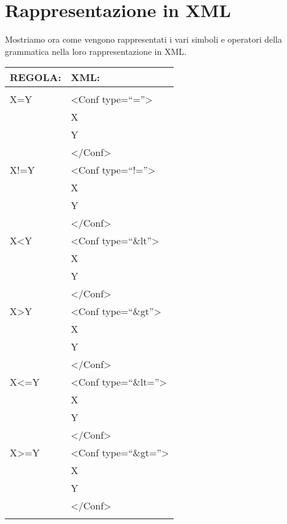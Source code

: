 \section{Rappresentazione in XML}
Mostriamo ora come vengono rappresentati i vari simboli e operatori della grammatica nella loro rappresentazione in XML.
\begin{table}[htbp]
\begin{tabular}{||p{3cm}||p{6.5cm}||}
\hline
\textbf{REGOLA:} & \textbf{XML:} \\ \hline
& \\ \hline
X=Y & \textless Conf type=``=''\textgreater \\
&   X \\
&   Y \\ 
& \textless /Conf\textgreater \\ \hline
X!=Y & \textless Conf type=``!=''\textgreater \\
&  X \\
&  Y \\ 
& \textless /Conf\textgreater\\ \hline
X\textless Y & \textless Conf type=``\&lt''\textgreater \\
&  X \\
&  Y \\ 
& \textless /Conf\textgreater\\ \hline
X\textgreater Y & \textless Conf type=``\&gt''\textgreater \\
&  X \\
&  Y \\ 
& \textless /Conf\textgreater\\ \hline
X\textless=Y & \textless Conf type=``\&lt=''\textgreater \\
&  X \\
&  Y \\ 
& \textless /Conf\textgreater\\ \hline
X\textgreater =Y &  \textless Conf type=``\&gt=''\textgreater \\
&  X \\
&  Y \\ 
& \textless /Conf\textgreater\\ \hline
& \\ \hline
\end{tabular} \\
\end{table}

